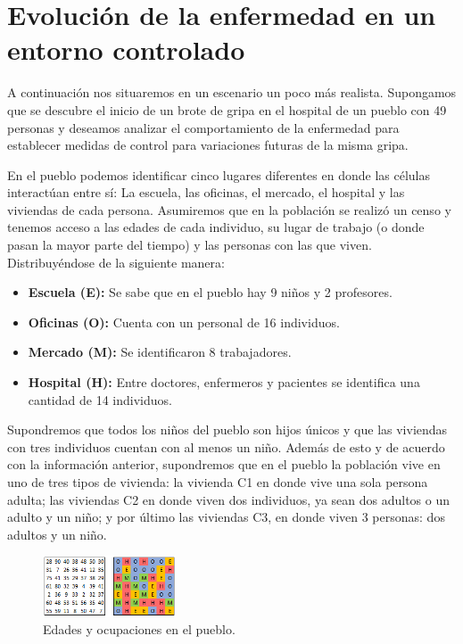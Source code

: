 \chapter{Evolución de la enfermedad en un entorno controlado}

A continuación nos situaremos en un escenario un poco más realista. Supongamos que se descubre el inicio de un brote de gripa en el hospital de un pueblo con 49 personas y deseamos analizar el comportamiento de la enfermedad para establecer medidas de control para variaciones futuras de la misma gripa.

En el pueblo podemos identificar cinco lugares diferentes en donde las células interactúan entre sí: La escuela, las oficinas, el mercado, el hospital y las viviendas de cada persona. Asumiremos que en la población se realizó un censo y tenemos acceso a las edades de cada individuo, su lugar de trabajo (o donde pasan la mayor parte del tiempo) y las personas con las que viven. Distribuyéndose de la siguiente manera:

\begin{itemize}
    \item \textbf{Escuela (E):} Se sabe que en el pueblo hay 9 niños y 2 profesores.
    \item \textbf{Oficinas (O):} Cuenta con un personal de 16 individuos.
    \item \textbf{Mercado (M):} Se identificaron 8 trabajadores.
    \item \textbf{Hospital (H):} Entre doctores, enfermeros y pacientes se identifica una cantidad de 14 individuos.
\end{itemize}

Supondremos que todos los niños del pueblo son hijos únicos y que las viviendas con tres individuos cuentan con al menos un niño. Además de esto y de acuerdo con la información anterior, supondremos que en el pueblo la población vive en uno de tres tipos de vivienda: la vivienda C1 en donde vive una sola persona adulta; las viviendas C2 en donde viven dos individuos, ya sean dos adultos o un adulto y un niño; y por último las viviendas C3, en donde viven 3 personas: dos adultos y un niño.

\begin{figure}[h]
  \centering
    \includegraphics[width=0.3525\textwidth]{Imagenes/edadesYOcupaciones.PNG}
    \caption{Edades y ocupaciones en el pueblo.}
    \label{fig:edadesYOcupaciones}
\end{figure}

